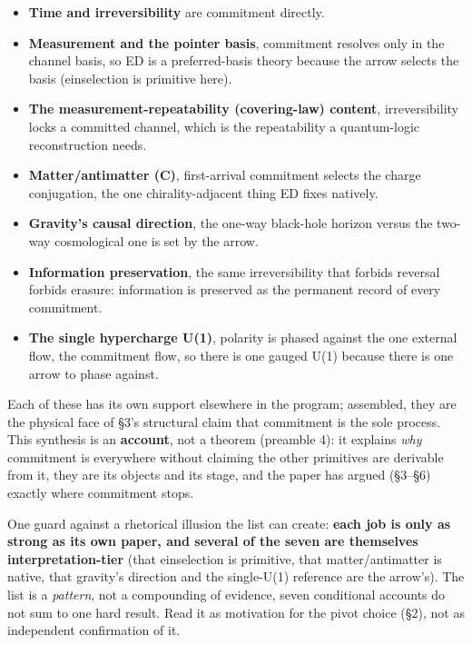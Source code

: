 \documentclass[
  11pt,
]{article}
\providecommand{\tightlist}{%
  \setlength{\itemsep}{0pt}\setlength{\parskip}{0pt}}
\begin{document}
\begin{itemize}
\tightlist
\item
  \textbf{Time and irreversibility} are commitment directly.
\item
  \textbf{Measurement and the pointer basis}, commitment resolves only
  in the channel basis, so ED is a preferred-basis theory because the
  arrow selects the basis (einselection is primitive here).
\item
  \textbf{The measurement-repeatability (covering-law) content},
  irreversibility locks a committed channel, which is the repeatability
  a quantum-logic reconstruction needs.
\item
  \textbf{Matter/antimatter (C)}, first-arrival commitment selects the
  charge conjugation, the one chirality-adjacent thing ED fixes
  natively.
\item
  \textbf{Gravity's causal direction}, the one-way black-hole horizon
  versus the two-way cosmological one is set by the arrow.
\item
  \textbf{Information preservation}, the same irreversibility that
  forbids reversal forbids erasure: information is preserved as the
  permanent record of every commitment.
\item
  \textbf{The single hypercharge U(1)}, polarity is phased against the
  one external flow, the commitment flow, so there is one gauged U(1)
  because there is one arrow to phase against.
\end{itemize}

Each of these has its own support elsewhere in the program; assembled,
they are the physical face of §3's structural claim that commitment is
the sole process. This synthesis is an \textbf{account}, not a theorem
(preamble 4): it explains \emph{why} commitment is everywhere without
claiming the other primitives are derivable from it, they are its
objects and its stage, and the paper has argued (§3--§6) exactly where
commitment stops.

One guard against a rhetorical illusion the list can create:
\textbf{each job is only as strong as its own paper, and several of the
seven are themselves interpretation-tier} (that einselection is
primitive, that matter/antimatter is native, that gravity's direction
and the single-U(1) reference are the arrow's). The list is a
\emph{pattern}, not a compounding of evidence, seven conditional
accounts do not sum to one hard result. Read it as motivation for the
pivot choice (§2), not as independent confirmation of it.
\end{document}
